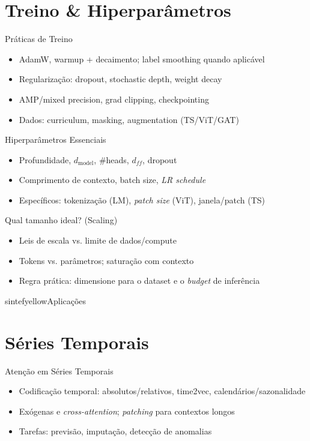 \documentclass{beamer}
\begin{document}
\section{Treino \& Hiperparâmetros}
\begin{frame}{Práticas de Treino}
	\begin{itemize}[<+->]
		\item AdamW, warmup + decaimento; label smoothing quando aplicável
		\item Regularização: dropout, stochastic depth, weight decay
		\item AMP/mixed precision, grad clipping, checkpointing
		\item Dados: curriculum, masking, augmentation (TS/ViT/GAT)
	\end{itemize}
\end{frame}

\begin{frame}{Hiperparâmetros Essenciais}
	\begin{itemize}[<+->]
		\item Profundidade, $d_{\text{model}}$, \#heads, $d_{ff}$, dropout
		\item Comprimento de contexto, batch size, \textit{LR schedule}
		\item Específicos: tokenização (LM), \textit{patch size} (ViT), janela/patch (TS)
	\end{itemize}
\end{frame}

\begin{frame}{Qual tamanho ideal? (Scaling)}
	\begin{itemize}[<+->]
		\item Leis de escala vs. limite de dados/compute
		\item Tokens vs. parâmetros; saturação com contexto
		\item Regra prática: dimensione para o dataset e o \textit{budget} de inferência
	\end{itemize}
\end{frame}

\begin{chapter}{sintefyellow}{Aplicações}\end{chapter}

\section{Séries Temporais}
\begin{frame}{Atenção em Séries Temporais}
	\begin{itemize}[<+->]
		\item Codificação temporal: absolutos/relativos, time2vec, calendários/sazonalidade
		\item Exógenas e \textit{cross-attention}; \textit{patching} para contextos longos
		\item Tarefas: previsão, imputação, detecção de anomalias
	\end{itemize}
\end{frame}
\end{document}
